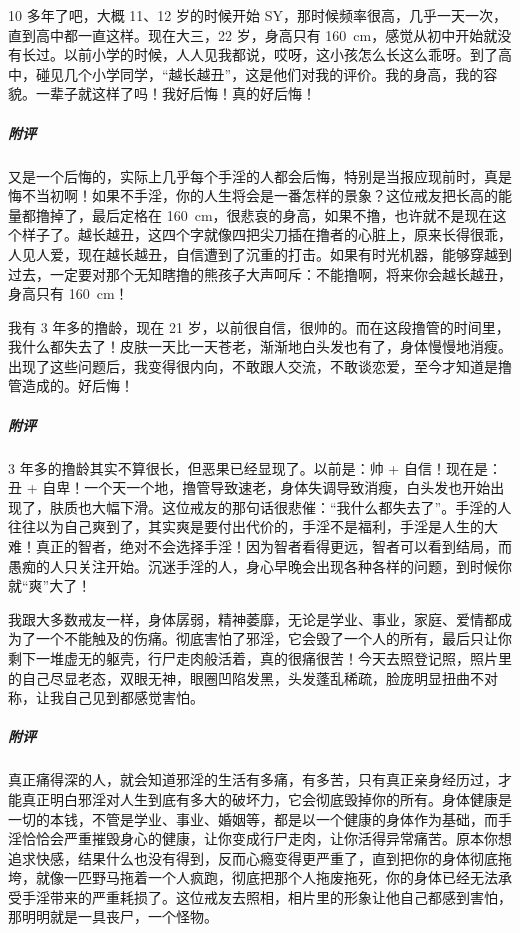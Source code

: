 \begin{case}[变丑]
    10 多年了吧，大概 11、12 岁的时候开始 SY，那时候频率很高，几乎一天一次，直到高中都一直这样。现在大三，22 岁，身高只有 \SI{160}{\centi\metre}，感觉从初中开始就没有长过。以前小学的时候，人人见我都说，哎呀，这小孩怎么长这么乖呀。到了高中，碰见几个小学同学，“越长越丑”，这是他们对我的评价。我的身高，我的容貌。一辈子就这样了吗！我好后悔！真的好后悔！
    \subparagraph{附评} 又是一个后悔的，实际上几乎每个手淫的人都会后悔，特别是当报应现前时，真是悔不当初啊！如果不手淫，你的人生将会是一番怎样的景象？这位戒友把长高的能量都撸掉了，最后定格在 \SI{160}{\centi\metre}，很悲哀的身高，如果不撸，也许就不是现在这个样子了。越长越丑，这四个字就像四把尖刀插在撸者的心脏上，原来长得很乖，人见人爱，现在越长越丑，自信遭到了沉重的打击。如果有时光机器，能够穿越到过去，一定要对那个无知瞎撸的熊孩子大声呵斥：不能撸啊，将来你会越长越丑，身高只有 \SI{160}{\centi\metre}！
\end{case}

\begin{case}[变丑]
    我有 3 年多的撸龄，现在 21 岁，以前很自信，很帅的。而在这段撸管的时间里，我什么都失去了！皮肤一天比一天苍老，渐渐地白头发也有了，身体慢慢地消瘦。出现了这些问题后，我变得很内向，不敢跟人交流，不敢谈恋爱，至今才知道是撸管造成的。好后悔！
    \subparagraph{附评} 3 年多的撸龄其实不算很长，但恶果已经显现了。以前是：帅 + 自信！现在是：丑 + 自卑！一个天一个地，撸管导致速老，身体失调导致消瘦，白头发也开始出现了，肤质也大幅下滑。这位戒友的那句话很悲催：“我什么都失去了”。手淫的人往往以为自己爽到了，其实爽是要付出代价的，手淫不是福利，手淫是人生的大难！真正的智者，绝对不会选择手淫！因为智者看得更远，智者可以看到结局，而愚痴的人只关注开始。沉迷手淫的人，身心早晚会出现各种各样的问题，到时候你就“爽”大了！
\end{case}

\begin{case}[变丑]
    我跟大多数戒友一样，身体孱弱，精神萎靡，无论是学业、事业，家庭、爱情都成为了一个不能触及的伤痛。彻底害怕了邪淫，它会毁了一个人的所有，最后只让你剩下一堆虚无的躯壳，行尸走肉般活着，真的很痛很苦！今天去照登记照，照片里的自己尽显老态，双眼无神，眼圈凹陷发黑，头发蓬乱稀疏，脸庞明显扭曲不对称，让我自己见到都感觉害怕。
    \subparagraph{附评} 真正痛得深的人，就会知道邪淫的生活有多痛，有多苦，只有真正亲身经历过，才能真正明白邪淫对人生到底有多大的破坏力，它会彻底毁掉你的所有。身体健康是一切的本钱，不管是学业、事业、婚姻等，都是以一个健康的身体作为基础，而手淫恰恰会严重摧毁身心的健康，让你变成行尸走肉，让你活得异常痛苦。原本你想追求快感，结果什么也没有得到，反而心瘾变得更严重了，直到把你的身体彻底拖垮，就像一匹野马拖着一个人疯跑，彻底把那个人拖废拖死，你的身体已经无法承受手淫带来的严重耗损了。这位戒友去照相，相片里的形象让他自己都感到害怕，那明明就是一具丧尸，一个怪物。
\end{case}

